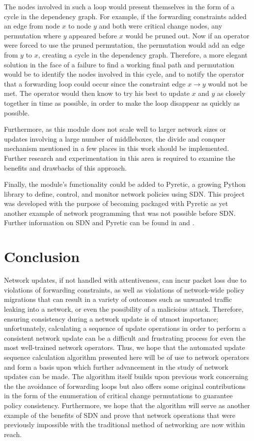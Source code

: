 \documentclass[pageno]{jpaper}
\begin{document}
The nodes involved in such a loop would present themselves in the form of a cycle in the dependency graph. For example, if the forwarding constraints added an edge from node $x$ to node $y$ and both were critical change nodes, any permutation where $y$ appeared before $x$ would be pruned out. Now if an operator were forced to use the pruned permutation, the permutation would add an edge from $y$ to $x$, creating a cycle in the dependency graph. Therefore, a more elegant solution in the face of a failure to find a working final path and permutation would be to identify the nodes involved in this cycle, and to notify the operator that a forwarding loop could occur since the constraint edge $x \rightarrow y$ would not be met. The operator would then know to try his best to update $x$ and $y$ as closely together in time as possible, in order to make the loop disappear as quickly as possible.

Furthermore, as this module does not scale well to larger network sizes or updates involving a large number of middleboxes, the divide and conquer mechanism mentioned in a few places in this work should be implemented. Further research and experimentation in this area is required to examine the benefits and drawbacks of this approach.

Finally, the module's functionality could be added to Pyretic, a growing Python library to define, control, and monitor network policies using SDN. This project was developed with the purpose of becoming packaged with Pyretic as yet another example of network programming that was not possible before SDN. Further information on SDN and Pyretic can be found in \cite{monsanto13} and \cite{pyretic}.


\section{Conclusion}
\label{sec:conclusion}
Network updates, if not handled with attentiveness, can incur packet loss due to violations of forwarding constraints, as well as violations of network-wide policy migrations that can result in a variety of outcomes such as unwanted traffic leaking into a network, or even the possibility of a malicioius attack. Therefore, ensuring consistency during a network update is of utmost importance; unfortunately, calculating a sequence of update operations in order to perform a consistent network update can be a difficult and frustrating process for even the most well-trained network operators. Thus, we hope that the automated update sequence calculation algorithm presented here will be of use to network operators and form a basis upon which further advancement in the study of network updates can be made. The algorithm itself builds upon previous work concerning the the avoidance of forwarding loops \cite{vanbever11} but also offers some original contributions in the form of the enumeration of critical change permutations to guarantee policy consistency. Furthermore, we hope that the algorithm will serve as another example of the benefits of SDN and prove that network operations that were previously impossible with the traditional method of networking are now within reach.\\
\end{document}
